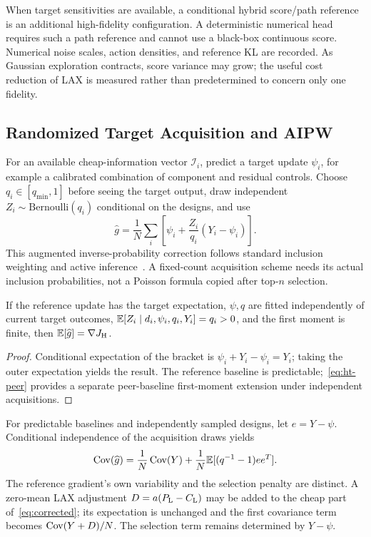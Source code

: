 When target sensitivities are available, a conditional hybrid score/path reference is an additional high-fidelity configuration. A deterministic numerical head requires such a path reference and cannot use a black-box continuous score. Numerical noise scales, action densities, and reference KL are recorded. As Gaussian exploration contracts, score variance may grow; the useful cost reduction of LAX is measured rather than predetermined to concern only one fidelity.

\subsection{Randomized Target Acquisition and AIPW}
For an available cheap-information vector $\mathcal I_i$, predict a target update $\psi_i$, for example a calibrated combination of component and residual controls. Choose $q_i\in[q_{\min},1]$ before seeing the target output, draw independent $Z_i\sim\mathrm{Bernoulli}(q_i)$ conditional on the designs, and use
\begin{equation}
\widehat g=\frac1N\sum_i\left[\psi_i+\frac{Z_i}{q_i}(Y_i-\psi_i)\right].
\label{eq:corrected}
\end{equation}
This augmented inverse-probability correction follows standard inclusion weighting and active inference~\cite{horvitz1952sampling,zrnic2024active}. A fixed-count acquisition scheme needs its actual inclusion probabilities, not a Poisson formula copied after top-$n$ selection.
\begin{proposition}
If the reference update has the target expectation, $\psi,q$ are fitted independently of current target outcomes, $\mathbb{E}[Z_i\mid d_i,\psi_i,q_i,Y_i]=q_i>0$, and the first moment is finite, then $\mathbb{E}[\widehat g]=\nabla J_{\mathrm{H}}$.
\end{proposition}
\begin{proof}
Conditional expectation of the bracket is $\psi_i+Y_i-\psi_i=Y_i$; taking the outer expectation yields the result. The reference baseline is predictable;~\eqref{eq:ht-peer} provides a separate peer-baseline first-moment extension under independent acquisitions.
\end{proof}

For predictable baselines and independently sampled designs, let $e=Y-\psi$. Conditional independence of the acquisition draws yields
\begin{equation}
\operatorname{Cov}(\widehat g)=\frac1N\operatorname{Cov}(Y)+\frac1N\mathbb{E}[(q^{-1}-1)ee^T].
\label{eq:aipw-variance}
\end{equation}
The reference gradient's own variability and the selection penalty are distinct. A zero-mean LAX adjustment $D=a(P_{\mathrm{L}}-C_{\mathrm{L}})$ may be added to the cheap part of~\eqref{eq:corrected}; its expectation is unchanged and the first covariance term becomes $\operatorname{Cov}(Y+D)/N$. The selection term remains determined by $Y-\psi$.

